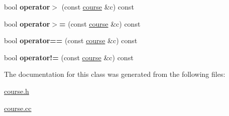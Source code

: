 \begin{DoxyCompactItemize}
\mbox{\label{classcourse_a16df685718a7ca9e98408b65109897b6}} 
bool {\bfseries operator$>$} (const \hyperlink{classcourse}{course} \&c) const
\item 
\mbox{\label{classcourse_ad15d2508cfb6d22103aaec608bcfdc74}} 
bool {\bfseries operator$>$=} (const \hyperlink{classcourse}{course} \&c) const
\item 
\mbox{\label{classcourse_aafce75fc85cdb94a5a08eaaba359da16}} 
bool {\bfseries operator==} (const \hyperlink{classcourse}{course} \&c) const
\item 
\mbox{\label{classcourse_ae01c5e2445600d485da28e0ba7c48b3a}} 
bool {\bfseries operator!=} (const \hyperlink{classcourse}{course} \&c) const
\end{DoxyCompactItemize}


The documentation for this class was generated from the following files\+:\begin{DoxyCompactItemize}
\item 
\hyperlink{course_8h}{course.\+h}\item 
\hyperlink{course_8cc}{course.\+cc}\end{DoxyCompactItemize}
